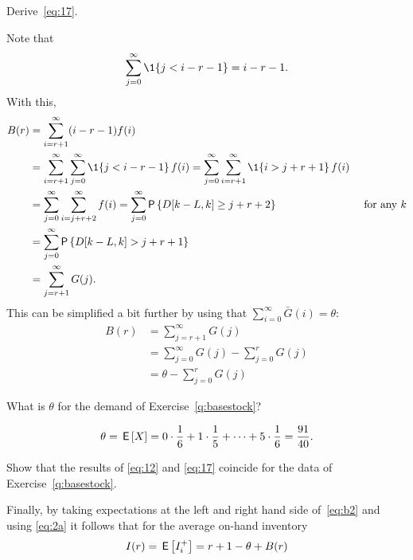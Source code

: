 \begin{exercise}[\faRocket]
Derive~\eqref{eq:17}.
\begin{solution}
Note  that
\begin{equation*}
  \sum_{j=0}^\infty \1{j< i-r - 1} = i-r -1.
\end{equation*}
With this,
\begin{align*}
       B(r) &= 
   \sum_{i=r+1}^\infty (i-r-1) f(i)   \\
   &= \sum_{i=r+1}^\infty\sum_{j=0}^\infty \1{j < i-r-1}\, f(i)   = 
    \sum_{j=0}^\infty \sum_{i=r+1}^\infty \1{i > j +r + 1}\, f(i)\\
   &= \sum_{j=0}^\infty \sum_{i=j + r+2}^\infty  f(i) = 
   \sum_{j=0}^\infty \P{D[k-L, k] \geq j + r+2}  &\text{ for any } k \\
   &=\sum_{j=0}^\infty \P{D[k-L, k] > j + r+1} \\
   &= \sum_{j=r+1}^\infty  G(j).
\end{align*}
This can be simplified a bit further by using that
$\sum_{i=0}^\infty \bar G(i) = \theta$:
\begin{align*}
   B(r) 
   &= \sum_{j=r+1}^\infty  G(j) \\
   &= \sum_{j=0}^\infty  G(j) - \sum_{j=0}^{r} G(j)\\
   &= \theta - \sum_{j=0}^{r} G(j)
\end{align*}
\end{solution}
\end{exercise}
	   
\begin{exercise}What is $\theta$ for the demand of Exercise~\ref{q:basestock}?
\begin{solution}
  \begin{align*}
    \theta = \,\mathsf{E}\left[X\right] =
0\cdot \frac 1 6 + 1\cdot \frac 1 5 + \cdots + 5 \cdot \frac 1 6 = \frac{91}{40}.
  \end{align*}
\end{solution}
\end{exercise}

\begin{exercise}
  Show that the results of \eqref{eq:12} and \eqref{eq:17} coincide for the data of Exercise~\ref{q:basestock}.
\end{exercise}


Finally, by taking expectations at the left and right hand side of~\eqref{eq:b2} and using \eqref{eq:2a} it follows that for the average on-hand inventory 
\begin{equation}\label{eq:19}
I(r) = \,\mathsf{E}\left[I_i^+\right] = r+1 - \theta + B(r)
\end{equation}

